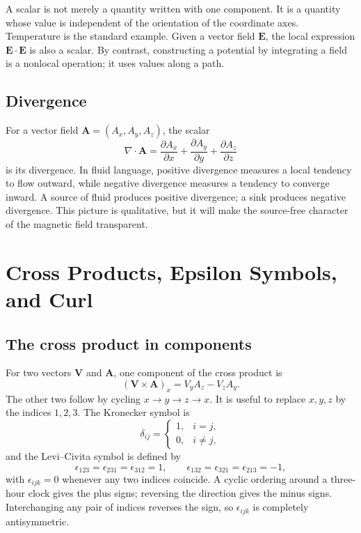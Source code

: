 A scalar is not merely a quantity written with one component. It is a quantity whose value is independent of the orientation of the coordinate axes. Temperature is the standard example. Given a vector field \(\mathbf E\), the local expression \(\mathbf E\cdot\mathbf E\) is also a scalar. By contrast, constructing a potential by integrating a field is a nonlocal operation; it uses values along a path.

\subsection{Divergence}

For a vector field \(\mathbf A=(A_x,A_y,A_z)\), the scalar
\begin{equation}
  \nabla\cdot\mathbf A
  =
  \frac{\partial A_x}{\partial x}
  +\frac{\partial A_y}{\partial y}
  +\frac{\partial A_z}{\partial z}
\end{equation}
is its divergence. In fluid language, positive divergence measures a local tendency to flow outward, while negative divergence measures a tendency to converge inward. A source of fluid produces positive divergence; a sink produces negative divergence. This picture is qualitative, but it will make the source-free character of the magnetic field transparent.

\section{Cross Products, Epsilon Symbols, and Curl}

\subsection{The cross product in components}

For two vectors \(\mathbf V\) and \(\mathbf A\), one component of the cross product is
\begin{equation}
  (\mathbf V\times\mathbf A)_x
  =
  V_yA_z-V_zA_y.
\end{equation}
The other two follow by cycling \(x\to y\to z\to x\). It is useful to replace \(x,y,z\) by the indices \(1,2,3\). The Kronecker symbol is
\begin{equation}
  \delta_{ij}
  =
  \begin{cases}
    1,&i=j,\\
    0,&i\ne j,
  \end{cases}
\end{equation}
and the Levi--Civita symbol is defined by
\begin{equation}
  \epsilon_{123}=\epsilon_{231}=\epsilon_{312}=1,
  \qquad
  \epsilon_{132}=\epsilon_{321}=\epsilon_{213}=-1,
\end{equation}
with \(\epsilon_{ijk}=0\) whenever any two indices coincide. A cyclic ordering around a three-hour clock gives the plus signs; reversing the direction gives the minus signs. Interchanging any pair of indices reverses the sign, so \(\epsilon_{ijk}\) is completely antisymmetric.

